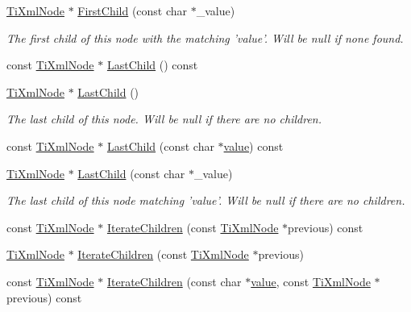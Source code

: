 \begin{DoxyCompactItemize}
\item 
\hyperlink{class_ti_xml_node}{Ti\+Xml\+Node} $\ast$ \hyperlink{class_ti_xml_node_abc8bf32be6419ec453a731868de19554}{First\+Child} (const char $\ast$\+\_\+value)
\begin{DoxyCompactList}\small\item\em The first child of this node with the matching 'value'. Will be null if none found. \end{DoxyCompactList}\item 
const \hyperlink{class_ti_xml_node}{Ti\+Xml\+Node} $\ast$ \hyperlink{class_ti_xml_node_a6d671107e00cca1d28cb2d7f3a87a21e}{Last\+Child} () const 
\item 
\hyperlink{class_ti_xml_node}{Ti\+Xml\+Node} $\ast$ \hyperlink{class_ti_xml_node_a6432d2b2495f6caf9cb4278df706a031}{Last\+Child} ()
\begin{DoxyCompactList}\small\item\em The last child of this node. Will be null if there are no children. \end{DoxyCompactList}\item 
const \hyperlink{class_ti_xml_node}{Ti\+Xml\+Node} $\ast$ \hyperlink{class_ti_xml_node_acdd3fdc436aa7433023310a041e5e63f}{Last\+Child} (const char $\ast$\hyperlink{class_ti_xml_node_aead528b3cedc33c16a6c539872c7cc8b}{value}) const 
\item 
\hyperlink{class_ti_xml_node}{Ti\+Xml\+Node} $\ast$ \hyperlink{class_ti_xml_node_abad5bf1059c48127b958711ef89e8e5d}{Last\+Child} (const char $\ast$\+\_\+value)
\begin{DoxyCompactList}\small\item\em The last child of this node matching 'value'. Will be null if there are no children. \end{DoxyCompactList}\item 
const \hyperlink{class_ti_xml_node}{Ti\+Xml\+Node} $\ast$ \hyperlink{class_ti_xml_node_aaef7ac3978c4bb1cc8a24ffae7bced75}{Iterate\+Children} (const \hyperlink{class_ti_xml_node}{Ti\+Xml\+Node} $\ast$previous) const 
\item 
\hyperlink{class_ti_xml_node}{Ti\+Xml\+Node} $\ast$ \hyperlink{class_ti_xml_node_a2358e747118fdbf0e467b1e4f7d03de1}{Iterate\+Children} (const \hyperlink{class_ti_xml_node}{Ti\+Xml\+Node} $\ast$previous)
\item 
const \hyperlink{class_ti_xml_node}{Ti\+Xml\+Node} $\ast$ \hyperlink{class_ti_xml_node_af2b86dbe25d3d26fa48180edc5e2a9fc}{Iterate\+Children} (const char $\ast$\hyperlink{class_ti_xml_node_aead528b3cedc33c16a6c539872c7cc8b}{value}, const \hyperlink{class_ti_xml_node}{Ti\+Xml\+Node} $\ast$previous) const 

\end{DoxyCompactItemize}
